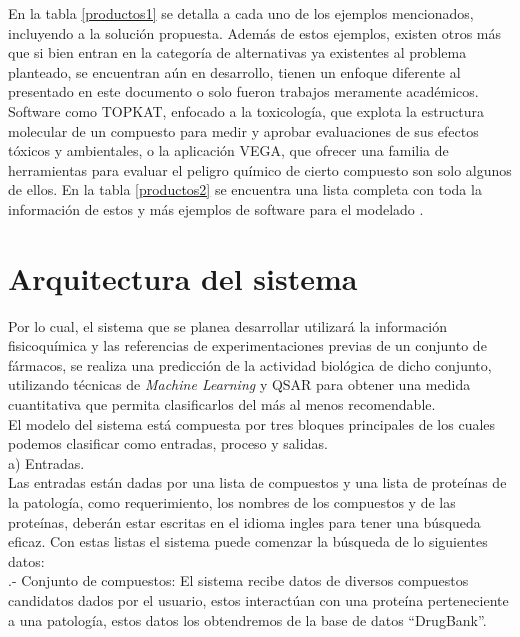 \noindent En la tabla \ref{productos1} se detalla a cada uno de los ejemplos mencionados, incluyendo a la solución propuesta.
Además de estos ejemplos, existen otros más que si bien entran en la categoría de alternativas ya existentes al problema planteado, se encuentran aún en desarrollo, tienen un enfoque diferente al presentado en este documento o solo fueron trabajos meramente académicos.\\

\noindent Software como TOPKAT, enfocado a la toxicología, que explota la estructura molecular de un compuesto para medir y aprobar evaluaciones de sus efectos tóxicos y ambientales, o la aplicación VEGA, que ofrecer una familia de herramientas para evaluar el peligro químico de cierto compuesto son solo algunos de ellos. En la tabla \ref{productos2} se encuentra una lista completa con toda la información de estos y más ejemplos de software para el modelado .\cite{13}


\newpage
\section{Arquitectura del sistema}
\noindent Por lo cual, el sistema que se planea desarrollar utilizará la información fisicoquímica y las referencias de experimentaciones previas de un conjunto de fármacos, se realiza una predicción de la actividad biológica de dicho conjunto, utilizando técnicas de \textit{Machine Learning} y QSAR para obtener una medida cuantitativa que permita clasificarlos del más al menos recomendable.\\

\noindent El modelo del sistema está compuesta por tres bloques principales de los cuales podemos clasificar como entradas, proceso y salidas.\\

a)	Entradas.\\

\noindent Las entradas están dadas por una lista de compuestos y una lista de proteínas de la patología, como requerimiento, los nombres de los compuestos y de las proteínas, deberán estar escritas en el idioma ingles para tener una búsqueda eficaz. Con estas listas el sistema puede comenzar la búsqueda de lo siguientes datos: \\

.- Conjunto de compuestos: El sistema recibe datos de diversos compuestos candidatos dados por el usuario, estos interactúan con una proteína perteneciente a una patología, estos datos los obtendremos de la base de datos “DrugBank”.\\

